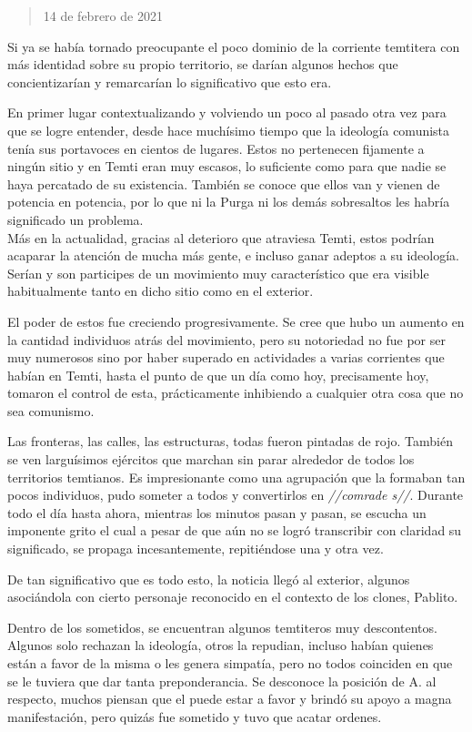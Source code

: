 \documentclass[
  spanish,
]{book}
\begin{document}
\begin{quote}
14 de febrero de 2021
\end{quote}

Si ya se había tornado preocupante el poco dominio de la corriente temtitera con más identidad sobre su propio territorio, se darían algunos hechos que concientizarían y remarcarían lo significativo que esto era.

En primer lugar contextualizando y volviendo un poco al pasado otra vez para que se logre entender, desde hace muchísimo tiempo que la ideología comunista tenía sus portavoces en cientos de lugares. Estos no pertenecen fijamente a ningún sitio y en Temti eran muy escasos, lo suficiente como para que nadie se haya percatado de su existencia. También se conoce que ellos van y vienen de potencia en potencia, por lo que ni la Purga ni los demás sobresaltos les habría significado un problema.\\
Más en la actualidad, gracias al deterioro que atraviesa Temti, estos podrían acaparar la atención de mucha más gente, e incluso ganar adeptos a su ideología. Serían y son participes de un movimiento muy característico que era visible habitualmente tanto en dicho sitio como en el exterior.

El poder de estos fue creciendo progresivamente. Se cree que hubo un aumento en la cantidad individuos atrás del movimiento, pero su notoriedad no fue por ser muy numerosos sino por haber superado en actividades a varias corrientes que habían en Temti, hasta el punto de que un día como hoy, precisamente hoy, tomaron el control de esta, prácticamente inhibiendo a cualquier otra cosa que no sea comunismo.

Las fronteras, las calles, las estructuras, todas fueron pintadas de rojo. También se ven larguísimos ejércitos que marchan sin parar alrededor de todos los territorios temtianos. Es impresionante como una agrupación que la formaban tan pocos individuos, pudo someter a todos y convertirlos en \emph{//comrade s//}. Durante todo el día hasta ahora, mientras los minutos pasan y pasan, se escucha un imponente grito el cual a pesar de que aún no se logró transcribir con claridad su significado, se propaga incesantemente, repitiéndose una y otra vez.

De tan significativo que es todo esto, la noticia llegó al exterior, algunos asociándola con cierto personaje reconocido en el contexto de los clones, Pablito.

Dentro de los sometidos, se encuentran algunos temtiteros muy descontentos. Algunos solo rechazan la ideología, otros la repudian, incluso habían quienes están a favor de la misma o les genera simpatía, pero no todos coinciden en que se le tuviera que dar tanta preponderancia. Se desconoce la posición de A. al respecto, muchos piensan que el puede estar a favor y brindó su apoyo a magna manifestación, pero quizás fue sometido y tuvo que acatar ordenes.
\end{document}

